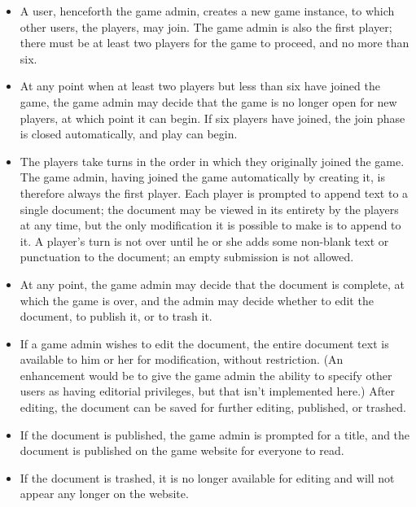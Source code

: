 \documentclass{manual}
\begin{document}
\begin{itemize}

\item A user, henceforth the game admin, creates a new game instance,
to which other users, the players, may join.  The game admin is also
the first player; there must be at least two players for the game to
proceed, and no more than six.  

\item At any point when at least two players but less than six have
joined the game, the game admin may decide that the game is no longer
open for new players, at which point it can begin.  If six players
have joined, the join phase is closed automatically, and play can
begin.

\item The players take turns in the order in which they originally
joined the game.  The game admin, having joined the game automatically
by creating it, is therefore always the first player.  Each player is
prompted to append text to a single document; the document may be
viewed in its entirety by the players at any time, but the only
modification it is possible to make is to append to it.  A player's
turn is not over until he or she adds some non-blank text or punctuation
to the document; an empty submission is not allowed.

\item At any point, the game admin may decide that the document is
complete, at which the game is over, and the admin may decide whether
to edit the document, to publish it, or to trash it.  

\item If a game admin wishes to edit the document, the entire document
text is available to him or her for modification, without restriction.
(An enhancement would be to give the game admin the ability to specify
other users as having editorial privileges, but that isn't implemented
here.)  After editing, the document can be saved for further editing,
published, or trashed.

\item If the document is published, the game admin is prompted for a
title, and the document is published on the game website for everyone
to read.

\item If the document is trashed, it is no longer available for
editing and will not appear any longer on the website.

\end{itemize}
\end{document}
